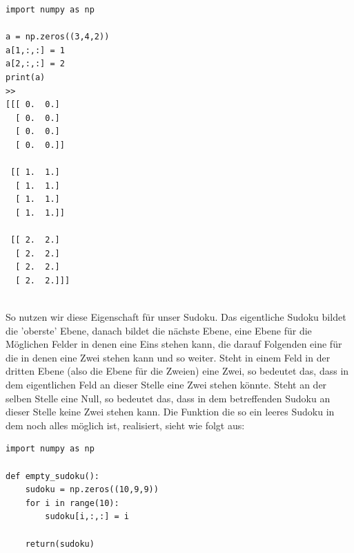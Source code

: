 \documentclass[11pt,a4paper]{article}
\begin{document}
\begin{verbatim}
import numpy as np

a = np.zeros((3,4,2))
a[1,:,:] = 1
a[2,:,:] = 2
print(a)
>> 
[[[ 0.  0.]
  [ 0.  0.]
  [ 0.  0.]
  [ 0.  0.]]

 [[ 1.  1.]
  [ 1.  1.]
  [ 1.  1.]
  [ 1.  1.]]

 [[ 2.  2.]
  [ 2.  2.]
  [ 2.  2.]
  [ 2.  2.]]]
\end{verbatim}
\ \\
So nutzen wir diese Eigenschaft für unser Sudoku. Das eigentliche Sudoku bildet die 'oberste' Ebene, danach bildet die nächste Ebene, eine Ebene für die Möglichen Felder in denen eine Eins stehen kann, die darauf Folgenden eine für die in denen eine Zwei stehen kann und so weiter. Steht in einem Feld in der dritten Ebene (also die Ebene für die Zweien) eine Zwei, so bedeutet das, dass in dem eigentlichen Feld an dieser Stelle eine Zwei stehen könnte. Steht an der selben Stelle eine Null, so bedeutet das, dass in dem betreffenden Sudoku an dieser Stelle keine Zwei stehen kann. Die Funktion die so ein leeres Sudoku in dem noch alles möglich ist, realisiert, sieht wie folgt aus:  
\ \\
\begin{verbatim}
import numpy as np       

def empty_sudoku():              
    sudoku = np.zeros((10,9,9))
    for i in range(10):
        sudoku[i,:,:] = i
    
    return(sudoku)
\end{verbatim}
\ \\
\newpage
\ \\
\end{document}
